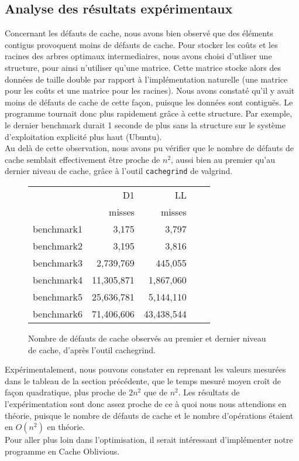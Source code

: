 \documentclass[a4paper, 10pt, french]{article}
\begin{document}
\subsection{Analyse des résultats expérimentaux}
Concernant les défauts de cache, nous avons bien observé que des éléments contigus provoquent moins de défauts de cache. Pour stocker les coûts et les racines des arbres optimaux intermediaires, nous avons choisi d'utliser une structure, pour ainsi n'utiliser qu'une matrice. Cette matrice stocke alors des données de taille double par rapport à l'implémentation naturelle (une matrice pour les coûts et une matrice pour les racines). Nous avons constaté qu'il y avait moins de défauts de cache de cette façon, puisque les données sont contiguës. Le programme tournait donc plus rapidement grâce à cette structure. Par exemple, le dernier benchmark durait 1 seconde de plus sans la structure sur le système d'exploitation explicité plus haut (Ubuntu).\\
Au delà de cette observation, nous avons pu vérifier que le nombre de défauts de cache semblait effectivement être proche de $n^2$, aussi bien au premier qu'au dernier niveau de cache, grâce à l'outil \texttt{cachegrind} de valgrind.

\begin{figure}[h]
      \begin{center}
        \begin{tabular}{|l||r||r|r|r||}
          \hline
          \hline
                    & D1 & LL \\
                & misses     & misses\\
          \hline
          \hline
            benchmark1 &  3,175 & 3,797\\
          \hline
            benchmark2 &    3,195 &  3,816\\
          \hline
            benchmark3 &   2,739,769 &445,055\\
          \hline
            benchmark4 &  11,305,871  & 1,867,060
            \\
          \hline
            benchmark5 &   25,636,781  &5,144,110\\
          \hline
            benchmark6 &   71,406,606 & 43,438,544 \\
          \hline
          \hline
        \end{tabular}
        \caption{Nombre de défauts de cache observés au premier et dernier niveau de cache, d'après l'outil cachegrind.}
        
        \label{table-defauts_cache}
      \end{center}
    \end{figure}

Expérimentalement, nous pouvons constater en reprenant les valeurs mesurées dans le tableau de la section précédente, que le temps mesuré moyen croît de façon quadratique, plus proche de $2n^2$ que de $n^2$. Les résultats de l'expérimentation sont donc assez proche de ce à quoi nous nous attendions en théorie, puisque le nombre de défauts de cache et le nombre d'opérations étaient en $O(n^2)$ en théorie. \\ 
Pour aller plus loin dans l'optimisation, il serait intéressant d'implémenter notre programme en Cache Oblivious.
\end{document}
